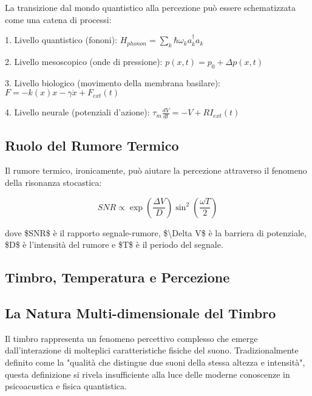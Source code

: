 \documentclass[a4paper,11pt]{article}
\begin{document}
La transizione dal mondo quantistico alla percezione può essere
schematizzata come una catena di processi:

1. Livello quantistico (fononi):
$H_{phonon} = \sum_k \hbar\omega_k a_k^\dagger a_k$

2. Livello mesoscopico (onde di pressione):
$p(x,t) = p_0 + \Delta p(x,t)$

3. Livello biologico (movimento della membrana basilare):
$F = -k(x)x - \gamma\dot{x} + F_{ext}(t)$

4. Livello neurale (potenziali d'azione):
$\tau_m\frac{dV}{dt} = -V + RI_{ext}(t)$

\subsection{Ruolo del Rumore Termico}\hypertarget{ruolo-del-rumore-termico}{}\label{ruolo-del-rumore-termico}

Il rumore termico, ironicamente, può aiutare la percezione attraverso il
fenomeno della risonanza stocastica:

\begin{displaymath}
SNR \propto \exp\left(\frac{\Delta V}{D}\right)\sin^2\left(\frac{\omega T}{2}\right)
\end{displaymath}

dove \$SNR\$ è il rapporto segnale-rumore, \$\textbackslash{}Delta V\$ è la barriera di
potenziale, \$D\$ è l'intensità del rumore e \$T\$ è il periodo del segnale.

\subsection{Timbro, Temperatura e Percezione}\hypertarget{timbro-temperatura-e-percezione}{}\label{timbro-temperatura-e-percezione}

\subsection{La Natura Multi-dimensionale del Timbro}\hypertarget{la-natura-multi-dimensionale-del-timbro}{}\label{la-natura-multi-dimensionale-del-timbro}

Il timbro rappresenta un fenomeno percettivo complesso che emerge
dall'interazione di molteplici caratteristiche fisiche del suono.
Tradizionalmente definito come la "qualità che distingue due suoni
della stessa altezza e intensità", questa definizione si rivela
insufficiente alla luce delle moderne conoscenze in psicoacustica e
fisica quantistica.
\end{document}
